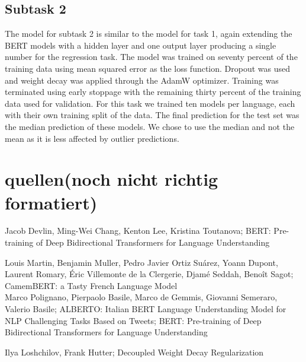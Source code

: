 \documentclass[]{article}
\begin{document}
\subsection*{Subtask 2}
The model for subtask 2 is similar to the model for task 1, again extending the BERT models with a hidden layer and one output layer producing a single number for the regression task. The model was trained on seventy percent of the training data using mean squared error as the loss function. Dropout was used and weight decay was applied through the AdamW optimizer. Training was terminated using early stoppage with the remaining thirty percent of the training data used for validation. For this task we trained ten models per language, each with their own training split of the data. The final prediction for the test set was the median prediction of these models. We chose to use the median and not the mean as it is less affected by outlier predictions.



\section*{quellen(noch nicht richtig formatiert)}

Jacob Devlin, Ming-Wei Chang, Kenton Lee, Kristina Toutanova; BERT: Pre-training of Deep Bidirectional Transformers for Language Understanding

Louis Martin, Benjamin Muller, Pedro Javier Ortiz Suárez, Yoann Dupont, Laurent Romary, Éric Villemonte de la Clergerie, Djamé Seddah, Benoît Sagot; CamemBERT: a Tasty French Language Model\\

Marco Polignano, Pierpaolo Basile, Marco de Gemmis, Giovanni Semeraro, Valerio Basile; ALBERTO: Italian BERT Language Understanding Model for NLP Challenging Tasks Based on Tweets; BERT: Pre-training of Deep Bidirectional Transformers for Language Understanding

Ilya Loshchilov, Frank Hutter; Decoupled Weight Decay Regularization
\end{document}
